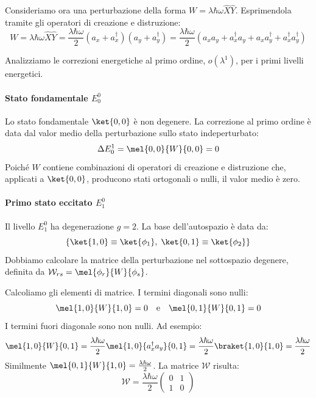 Consideriamo ora una perturbazione della forma \( W = \lambda \hbar \omega \hat{X}\hat{Y} \). Esprimendola tramite gli operatori di creazione e distruzione:
\begin{equation}
    W = \lambda \hbar \omega \hat{X}\hat{Y} = \frac{\lambda \hbar \omega}{2} (a_x + a_x^\dagger)(a_y + a_y^\dagger)
    = \frac{\lambda \hbar \omega}{2} \left( a_x a_y + a_x^\dagger a_y + a_x a_y^\dagger + a_x^\dagger a_y^\dagger \right)
\end{equation}

Analizziamo le correzioni energetiche al primo ordine, $o(\lambda^1)$, per i primi livelli energetici.


\paragraph{Stato fondamentale $E_0^0$}


Lo stato fondamentale $\ket{0,0}$ è non degenere. La correzione al primo ordine è data dal valor medio della perturbazione sullo stato indeperturbato:
\[
    \Delta E_0^1 = \mel{0,0}{W}{0,0} = 0
\]
Poiché $W$ contiene combinazioni di operatori di creazione e distruzione che, applicati a $\ket{0,0}$, producono stati ortogonali o nulli, il valor medio è zero.

\paragraph{Primo stato eccitato $E_1^0$}
Il livello $E_1^0$ ha degenerazione $g=2$. La base dell'autospazio è data da:
\[
    \left\{ \ket{1,0} \equiv \ket{\phi_1},\; \ket{0,1} \equiv \ket{\phi_2} \right\}
\]
Dobbiamo calcolare la matrice della perturbazione nel sottospazio degenere, definita da $\mathcal{W}_{rs} = \mel{\phi_r}{W}{\phi_s}$.

Calcoliamo gli elementi di matrice. I termini diagonali sono nulli:
\[
    \mel{1,0}{W}{1,0} = 0 \quad \text{e} \quad \mel{0,1}{W}{0,1} = 0
\]
I termini fuori diagonale sono non nulli. Ad esempio:
\[
    \mel{1,0}{W}{0,1} = \frac{\lambda \hbar \omega}{2} \mel{1,0}{a_x^\dagger a_y}{0,1} = \frac{\lambda \hbar \omega}{2} \braket{1,0}{1,0} = \frac{\lambda \hbar \omega}{2}
\]
Similmente $\mel{0,1}{W}{1,0} = \frac{\lambda \hbar \omega}{2}$. La matrice $\mathcal{W}$ risulta:
\[
    \mathcal{W} = \frac{\lambda \hbar \omega}{2} 
    \begin{pmatrix}
        0 & 1 \\
        1 & 0
    \end{pmatrix}
\]

